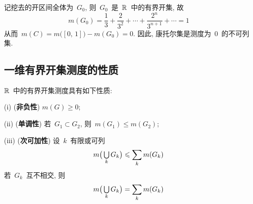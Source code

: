 \medskip

\begin{solution}
记挖去的开区间全体为~$G_0$, 则~$G_0$~是~$\mathbb{R}$~中的有界开集, 故
\[
m(G_0) = \frac{1}{3} + \frac{2}{3^2} + \cdots + \frac{2^n}{3^{n+1}} + \cdots = 1
\]
从而~$m(C) = m\big([0,\,1]\big) - m(G_0) = 0$. 因此, 康托尔集是测度为~$0$~的不可列集.
\end{solution}

\subsection{一维有界开集测度的性质}

\begin{proposition} \label{prop221}
$\mathbb{R}$~中的有界开集测度具有如下性质:

(i) (\textbf{非负性}) $m(G) \geqslant 0$;

(ii) (\textbf{单调性}) 若~$G_1 \subset G_2$, 则~$m(G_1) \leqslant m(G_2)$;

(iii) (\textbf{次可加性}) 设~$k$~有限或可列
\[
m\big( \mathop{\textstyle{\bigcup}}_k G_k \big) \leqslant \sum_k m(G_k)
\]
\noindent 若~$G_k$~互不相交, 则
\[
m\big( \mathop{\textstyle{\bigcup}}_k G_k \big) = \sum_k m(G_k)
\]
\end{proposition}

